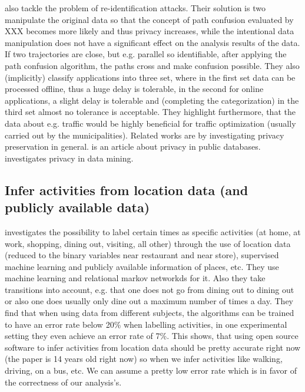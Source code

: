 \parencite{hoh2005protecting} also tackle the problem of re-identification attacks. Their solution is two manipulate the original data so that the concept of path confusion evaluated by XXX becomes more likely and thus privacy increases, while the intentional data manipulation does not have a significant effect on the analysis results of the data. If two trajectories are close, but e.g. parallel so identifiable, after applying the path confusion algorithm, the paths cross and make confusion possible. They also (implicitly) classify applications into three set, where in the first set data can be processed offline, thus a huge delay is tolerable, in the second for online applications, a slight delay is tolerable and (completing the categorization) in the third set almost no tolerance is acceptable. They highlight furthermore, that the data about e.g. traffic would be highly beneficial for traffic optimization (usually carried out by the municipalities).
Related works are by \parencite{agrawal2001design, agrawal2000privacy, myles2003preserving} investigating privacy preservation in general. \parencite{chawla2005toward} is an article about privacy in public databases. \parencite{kargupta2005random} investigates privacy in data mining.

\subsection{Infer activities from location data (and publicly available data)}

\parencite{liao2005location} investigates the possibility to label certain times as specific activities (at home, at work, shopping, dining out, visiting, all other) through the use of location data (reduced to the binary variables near restaurant and near store), supervised machine learning and publicly available information of places, etc. They use machine learning and relational markov networkds for it. Also they take transitions into account, e.g. that one does not go from dining out to dining out or also one does usually only dine out a maximum number of times a day. They find that when using data from different subjects, the algorithms can be trained to have an error rate below 20\% when labelling activities, in one experimental setting they even achieve an error rate of 7\%. This shows, that using open source software to infer activities from location data should be pretty accurate right now (the paper is 14 years old right now) so when we infer activities like walking, driving, on a bus, etc. We can assume a pretty low error rate which is in favor of the correctness of our analysis's.

